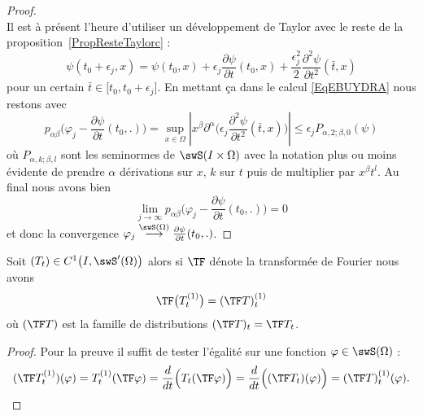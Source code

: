 \begin{proof}
\begin{equation}
	\end{equation}
	Il est à présent l'heure d'utiliser un développement de Taylor avec le reste de la proposition~\ref{PropResteTaylorc} :
	\begin{equation}
		\psi(t_0+\epsilon_j,x)=\psi(t_0,x)+\epsilon_j\frac{ \partial \psi }{ \partial t }(t_0,x)+\frac{ \epsilon_j^2 }{2}\frac{ \partial^2\psi  }{ \partial t^2 }(\bar t,x)
	\end{equation}
	pour un certain \( \bar t\in\mathopen[ t_0 , t_0+\epsilon_j \mathclose]\). En mettant ça dans le calcul \eqref{EqEBUYDRA} nous restons avec
	\begin{equation}
		p_{\alpha\beta}\big( \varphi_j-\frac{ \partial \psi }{ \partial t }(t_0,.) \big)=\sup_{x\in\Omega}\left| x^{\beta}\partial^{\alpha}\Big( \epsilon_j\frac{ \partial^2\psi }{ \partial t^2 }(\bar t,x) \Big) \right| \leq \epsilon_j P_{\alpha,2;\beta,0}(\psi)
	\end{equation}
	où \( P_{\alpha,k;\beta,l}\) sont les seminormes de \( \swS(I\times \Omega)\) avec la notation plus ou moins évidente de prendre \( \alpha\) dérivations sur \( x\), \( k\) sur \( t\) puis de multiplier par \( x^{\beta}t^l\). Au final nous avons bien
	\begin{equation}
		\lim_{j\to \infty} p_{\alpha\beta}\big( \varphi_j-\frac{ \partial \psi }{ \partial t }(t_0,.) \big)=0
	\end{equation}
	et donc la convergence \( \varphi_j\stackrel{\swS(\Omega)}{\longrightarrow}\frac{ \partial \psi }{ \partial t }(t_0,.)\).
\end{proof}

\begin{lemma}   \label{LemWRoRPIX}
	Soit \( (T_t)\in C^1\big( I,\swS'(\Omega) \big)\) alors si \( \TF\) dénote la transformée de Fourier nous avons
	\begin{equation}
		\TF\big( T_t^{(1)} \big)=(\TF T)_t^{(1)}
	\end{equation}
	où \( (\TF T)\) est la famille de distributions \( (\TF T)_t=\TF T_t\).
\end{lemma}

\begin{proof}
	Pour la preuve il suffit de tester l'égalité sur une fonction \( \varphi\in\swS(\Omega)\) :
	\begin{equation}
		(\TF T_t^{(1)})(\varphi)=T_t^{(1)}(\TF \varphi)=\frac{ d }{ dt }\Big( T_t(\TF \varphi) \Big)=\frac{ d }{ dt }\Big( (\TF T_t)(\varphi) \Big)=(\TF T)_t^{(1)}(\varphi).
	\end{equation}
\end{proof}
